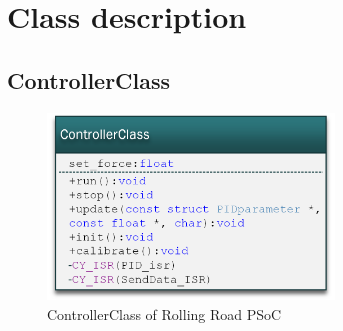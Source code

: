 \section{Class description}

\subsection{ControllerClass}

\begin{figure}[H]
	\centering
	\includegraphics [width=3in]{Software/Pictures/klassediagram_ControllerClass.png}
	\caption{ControllerClass of Rolling Road PSoC}
	\label{fig:Class_diagram_ControllerClass_RR_PSoC}
\end{figure}

